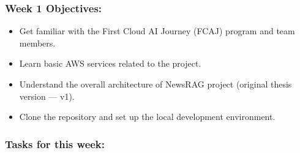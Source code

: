 \hypertarget{week-1-objectives}{%
\subsubsection{Week 1 Objectives:}}

\begin{itemize}
\tightlist
\item
  Get familiar with the First Cloud AI Journey (FCAJ) program and team
  members.
\item
  Learn basic AWS services related to the project.
\item
  Understand the overall architecture of NewsRAG project (original
  thesis version --- v1).
\item
  Clone the repository and set up the local development environment.
\end{itemize}

\hypertarget{tasks-for-this-week}{%
\subsubsection{Tasks for this week:}}

